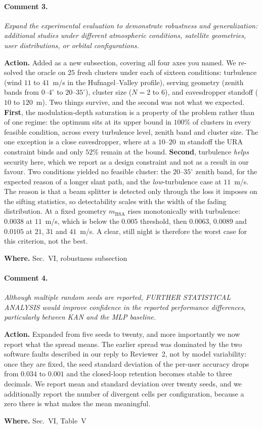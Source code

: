 \documentclass[10pt]{article}
\newcommand{\rev}[1]{\par\medskip\noindent\textit{#1}\par\smallskip}
\newcommand{\act}[2]{\noindent\textbf{Action.} #1\par\noindent\textbf{Where.} #2\par}
\begin{document}
\paragraph{Comment 3.}
\rev{Expand the experimental evaluation to demonstrate robustness and generalization: additional studies under different atmospheric conditions, satellite geometries, user distributions, or orbital configurations.}
\act{Added as a new subsection, covering all four axes you named. We re-solved the oracle on $25$ fresh clusters under each of sixteen conditions: turbulence (wind $11$ to $41$~m/s in the Hufnagel--Valley profile), serving geometry (zenith bands from $0$--$4^\circ$ to $20$--$35^\circ$), cluster size ($N{=}2$ to $6$), and eavesdropper standoff ($10$ to $120$~m). Two things survive, and the second was not what we expected. \textbf{First}, the modulation-depth saturation is a property of the problem rather than of one regime: the optimum sits at its upper bound in $100\%$ of clusters in every feasible condition, across every turbulence level, zenith band and cluster size. The one exception is a close eavesdropper, where at a $10$--$20$~m standoff the URA constraint binds and only $52\%$ remain at the bound. \textbf{Second}, turbulence \emph{helps} security here, which we report as a design constraint and not as a result in our favour. Two conditions yielded no feasible cluster: the $20$--$35^\circ$ zenith band, for the expected reason of a longer slant path, and the \emph{low}-turbulence case at $11$~m/s. The reason is that a beam splitter is detected only through the loss it imposes on the sifting statistics, so detectability scales with the width of the fading distribution. At a fixed geometry $m_{\mathrm{BSA}}$ rises monotonically with turbulence: $0.0038$ at $11$~m/s, which is below the $0.005$ threshold, then $0.0063$, $0.0089$ and $0.0105$ at $21$, $31$ and $41$~m/s. A clear, still night is therefore the worst case for this criterion, not the best.}{Sec.~VI, robustness subsection}

\paragraph{Comment 4.}
\rev{Although multiple random seeds are reported, FURTHER STATISTICAL ANALYSIS would improve confidence in the reported performance differences, particularly between KAN and the MLP baseline.}
\act{Expanded from five seeds to twenty, and more importantly we now report what the spread means. The earlier spread was dominated by the two software faults described in our reply to Reviewer~2, not by model variability: once they are fixed, the seed standard deviation of the per-user accuracy drops from $0.034$ to $0.001$ and the closed-loop retention becomes stable to three decimals. We report mean and standard deviation over twenty seeds, and we additionally report the number of divergent cells per configuration, because a zero there is what makes the mean meaningful.}{Sec.~VI, Table~V}
\end{document}
